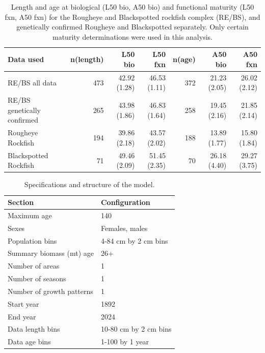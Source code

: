 \documentclass[
]{scrartcl}
\begin{document}
\begin{longtable}{lrrrrrr}

\caption{\label{tbl-maturity_estimates}Length and age at biological (L50
bio, A50 bio) and functional maturity (L50 fxn, A50 fxn) for the
Rougheye and Blackspotted rockfish complex (RE/BS), and genetically
confirmed Rougheye and Blackspotted separately. Only certain maturity
determinations were used in this analysis.}

\tabularnewline

\toprule
Data used & n(length) & L50 bio & L50 fxn & n(age) & A50 bio & A50 fxn \\ 
\midrule\addlinespace[2.5pt]
RE/BS all data & 473 & 42.92 (1.28) & 46.53 (1.11) & 372 & 21.23 (2.05) & 26.02 (2.12) \\ 
RE/BS genetically confirmed & 265 & 43.98 (1.86) & 46.83 (1.64) & 258 & 19.45 (2.16) & 21.85 (2.14) \\ 
Rougheye Rockfish & 194 & 39.86 (2.18) & 43.57 (2.02) & 188 & 13.89 (1.77) & 15.80 (1.84) \\ 
Blackspotted Rockfish & 71 & 49.46 (2.09) & 51.45 (2.35) & 70 & 26.18 (4.40) & 29.27 (3.75) \\ 
\bottomrule

\end{longtable}

\endgroup

\newpage{}

\begingroup
\fontsize{9.0pt}{10.8pt}\selectfont

\begin{longtable}{ll}

\caption{\label{tbl-model-config}Specifications and structure of the
model.}

\tabularnewline

\toprule
Section & Configuration \\ 
\midrule\addlinespace[2.5pt]
Maximum age & 140 \\ 
Sexes & Females, males \\ 
Population bins & 4-84 cm by 2 cm bins \\ 
Summary biomass (mt) age & 26+ \\ 
Number of areas & 1 \\ 
Number of seasons & 1 \\ 
Number of growth patterns & 1 \\ 
Start year & 1892 \\ 
End year & 2024 \\ 
Data length bins & 10-80 cm by 2 cm bins \\ 
Data age bins & 1-100 by 1 year \\ 
\bottomrule

\end{longtable}
\end{document}
